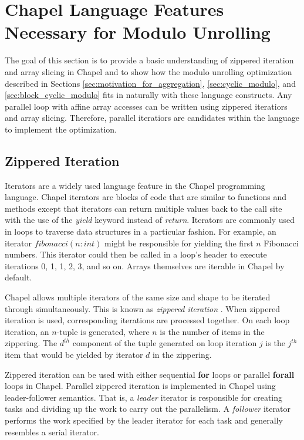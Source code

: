 \section{Chapel Language Features Necessary for Modulo Unrolling}\label{sec:language_features}

The goal of this section is to provide a basic understanding of zippered iteration and array slicing in Chapel and to show how the modulo unrolling optimization described in Sections \ref{sec:motivation_for_aggregation}, \ref{sec:cyclic_modulo}, and \ref{sec:block_cyclic_modulo} fits in naturally with these language constructs. Any parallel loop with affine array accesses can be written using zippered iteratiors and array slicing. Therefore, parallel iteratiors are candidates within the language to implement the optimization.

\subsection{Zippered Iteration}\label{sec:zippered_iteration}

Iterators are a widely used language feature in the Chapel programming language. Chapel iterators are blocks of code that are similar to functions and methods except that iterators can return multiple values back to the call site with the use of the \textit{yield} keyword instead of \textit{return}. Iterators are commonly used in loops to traverse data structures in a particular fashion. For example, an iterator $fibonacci(n: int)$ might be responsible for yielding the first $n$ Fibonacci numbers. This iterator could then be called in a loop's header to execute iterations 0, 1, 1, 2, 3, and so on. Arrays themselves are iterable in Chapel by default. 

Chapel allows multiple iterators of the same size and shape to be iterated through simultaneously. This is known as \textit{zippered iteration} \cite{chamberlain2011user}. When zippered iteration is used, corresponding iterations are processed together. On each loop iteration, an $n$-tuple is generated, where $n$ is the number of items in the zippering. The $d^{th}$ component of the tuple generated on loop iteration $j$ is the $j^{th}$ item that would be yielded by iterator $d$ in the zippering. 

Zippered iteration can be used with either sequential \textbf{for} loops or parallel \textbf{forall} loops in Chapel. Parallel zippered iteration is implemented in Chapel using leader-follower semantics. That is, a \textit{leader} iterator is responsible for creating tasks and dividing up the work to carry out the parallelism. A \textit{follower} iterator performs the work specified by the leader iterator for each task and generally resembles a serial iterator. 

